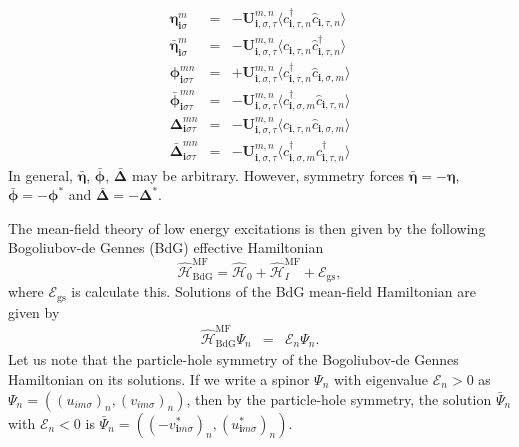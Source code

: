 \begin{eqnarray}
\bm{\eta}_{\mathbf{i}\sigma}^{m} &=& -\bm{U}_{\mathbf{i},\sigma,\tau}^{m,n} \langle \hat c_{\mathbf{i},\tau,n}^\dagger \hat c_{\mathbf{i}, \tau, n} \rangle \\
\bar{\bm{\eta}}_{\mathbf{i}\sigma}^{m} &=& -\bm{U}_{\mathbf{i},\sigma,\tau}^{m,n} \langle c_{\mathbf{i},\tau,n} \hat c_{\mathbf{i}, \tau, n}^\dagger \rangle \\
\bm{\phi}_{\mathbf{i}\sigma\tau}^{mn} &=& +\bm{U}_{\mathbf{i},\sigma,\tau}^{m,n} \langle\hat c_{\mathbf{i},\tau,n}^\dagger \hat c_{\mathbf{i}, \sigma, m} \rangle \\
\bar{\bm{\phi}}_{\mathbf{i}\sigma\tau}^{mn} &=& -\bm{U}_{\mathbf{i},\sigma,\tau}^{m,n} \langle\hat c_{\mathbf{i},\sigma,m}^\dagger\hat c_{\mathbf{i}, \tau, n} \rangle \\
\bm{\Delta}_{\mathbf{i}\sigma\tau}^{mn} &=& -\bm{U}_{\mathbf{i},\sigma,\tau}^{m,n} \langle \hat c_{\mathbf{i}, \tau, n} \hat c_{\mathbf{i},\sigma,m}\rangle\\
\bar{\bm{\Delta}}_{\mathbf{i}\sigma\tau}^{mn} &=& -\bm{U}_{\mathbf{i},\sigma,\tau}^{m,n} \langle \hat c_{\mathbf{i}, \sigma, m}^\dagger c_{\mathbf{i},\tau,n}^\dagger\rangle 
\end{eqnarray}
In general, $\bar{\bm{\eta}}$, $\bar{\bm{\phi}}$, $\bar{\bm{\Delta}}$ may be arbitrary. However, symmetry forces $\bar{\bm{\eta}}=-\bm{\eta}$, $\bar{\bm{\phi}}=-\bm{\phi}^*$ and $\bar{\bm{\Delta}}=-\bm{\Delta}^*$.

The mean-field theory of low energy excitations is then given by the following Bogoliubov-de Gennes (BdG) effective Hamiltonian
\begin{equation}
\hat{\mathcal{H}}_\text{BdG}^\text{MF} = \hat{\mathcal{H}}_\text{0} + \hat{\mathcal{H}}_{I}^\text{MF} + \mathcal{E}_\text{gs},
\label{eq:general_BdG}
\end{equation}
where $\mathcal{E}_\text{gs}$ is {\color{red} calculate this}.
Solutions of the BdG mean-field Hamiltonian are given by
\begin{eqnarray}
\hat{\mathcal{H}}_\text{BdG}^\text{MF}
\Psi_n
&=&
\mathcal{E}_n
\Psi_n.
\end{eqnarray}
Let us note that the particle-hole symmetry of the Bogoliubov-de Gennes Hamiltonian on its solutions.
If we write a spinor $\Psi_n$ with eigenvalue $\mathcal{E}_n>0$ as
$\Psi_n=\left((u_{im\sigma})_n,(v_{im\sigma})_n\right)$, then by the particle-hole symmetry, the solution $\bar\Psi_n$ with $\mathcal{E}_n<0$ is $\bar\Psi_n = ((-v^*_{\mathbf{i}m\sigma})_n, (u^*_{\mathbf{i}m\sigma})_n)$.

